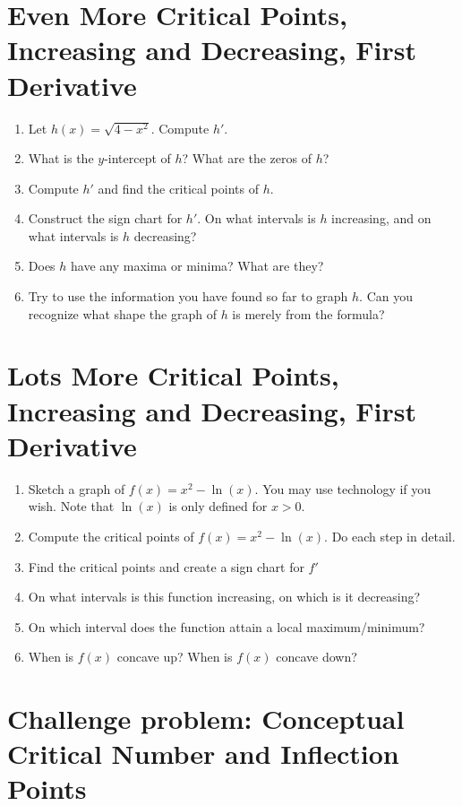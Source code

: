 \documentclass[10pt]{article}
\begin{document}
\section{Even More Critical Points, Increasing and Decreasing, First Derivative}
\begin{enumerate}
    \item Let $h(x) = \sqrt{4 - x^2}$. Compute $h'$.
    \item What is the $y$-intercept of $h$? What are the zeros of $h$?
    \item Compute $h'$ and find the critical points of $h$. 
    \item Construct the sign chart for $h'$. On what intervals is $h$ increasing, and on what intervals is $h$ decreasing? 
    \item Does $h$ have any maxima or minima? What are they?
    \item Try to use the information you have found so far to graph $h$. Can you recognize what shape the graph of $h$ is merely from the formula? 
\end{enumerate}
\newpage


\section{Lots More Critical Points, Increasing and Decreasing, First Derivative}
\begin{enumerate}
    \item Sketch a graph of $f(x)=x^{2}-\ln(x).$ You may use technology if you wish. Note that $\ln(x)$ is only defined for $x > 0$. 
    \item Compute the critical points of $f(x)=x^{2}-\ln(x).$ Do each step in detail. 
    \item Find the critical points and create a sign chart for $f'$
    \item On what intervals is this function increasing, on which is it decreasing? 
    \item On which interval does the function attain a local maximum/minimum?
    \item When is $f(x)$ concave up? When is $f(x)$ concave down? 
\end{enumerate}

\newpage

\section{Challenge problem: Conceptual Critical Number and Inflection Points}
\end{document}
